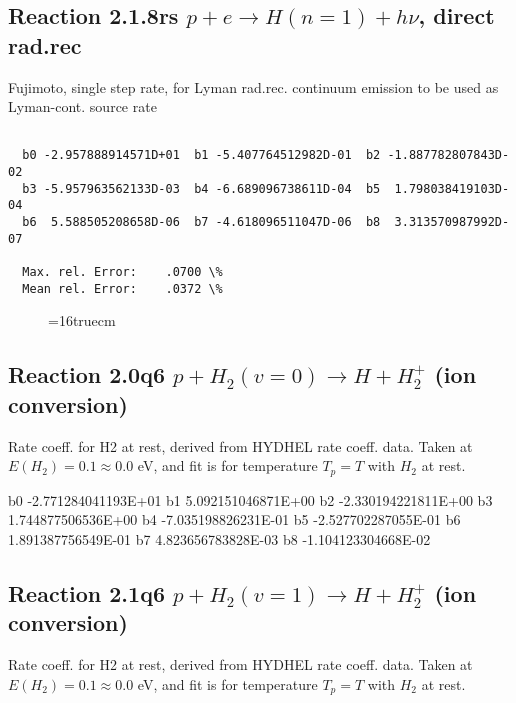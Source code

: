 \documentclass[12pt,dvipdfmx]{article}
\begin{document}
\subsection{
Reaction 2.1.8rs
 $ p + e \rightarrow H(n=1) + h\nu$, direct rad.rec
}
Fujimoto, single step rate, for Lyman rad.rec. continuum emission
to be used as Lyman-cont. source rate

\begin{small}\begin{verbatim}

  b0 -2.957888914571D+01  b1 -5.407764512982D-01  b2 -1.887782807843D-02
  b3 -5.957963562133D-03  b4 -6.689096738611D-04  b5  1.798038419103D-04
  b6  5.588505208658D-06  b7 -4.618096511047D-06  b8  3.313570987992D-07

  Max. rel. Error:    .0700 \%
  Mean rel. Error:    .0372 \%

\end{verbatim}\end{small}
\begin{figure} \label{2.1.8rs}
\epsfxsize=16truecm
\end{figure}
\newpage

\subsection{
Reaction 2.0q6
$ p + H_2(v=0) \rightarrow H + H_2^+$ (ion conversion)
}
Rate coeff. for H2 at rest, derived from HYDHEL rate coeff. data.
Taken at $E(H_2) = 0.1 \approx 0.0$ eV,  and fit is for temperature $T_p=T$ with $H_2$ at rest.

\begin{{small}}\begin{{verbatim}}

  b0 -2.771284041193E+01  b1  5.092151046871E+00  b2 -2.330194221811E+00
  b3  1.744877506536E+00  b4 -7.035198826231E-01  b5 -2.527702287055E-01
  b6  1.891387756549E-01  b7  4.823656783828E-03  b8 -1.104123304668E-02

\end{{verbatim}}\end{{small}}

\newpage


\subsection{
Reaction 2.1q6
$ p + H_2(v=1) \rightarrow H + H_2^+$ (ion conversion)
}
Rate coeff. for H2 at rest, derived from HYDHEL rate coeff. data.
Taken at $E(H_2) = 0.1 \approx 0.0$ eV,  and fit is for temperature $T_p=T$ with $H_2$ at rest.
\end{document}

